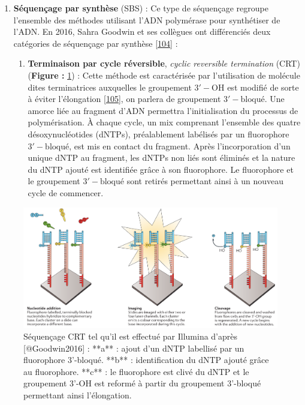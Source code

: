 \documentclass[12pt,twoside]{reedthesis}
\providecommand{\tightlist}{%
  \setlength{\itemsep}{0pt}\setlength{\parskip}{0pt}}
\theoremstyle{definition}
\theoremstyle{definition}
\theoremstyle{remark}
\begin{document}
  \begin{enumerate}
  \def\labelenumi{\arabic{enumi}.}
  \tightlist
  \item
    \textbf{Séquençage par synthèse} (SBS) : Ce type de séquençage
    regroupe l'ensemble des méthodes utilisant l'ADN polymérase pour
    synthétiser de l'ADN. En 2016, Sahra Goodwin et ses collègues ont
    différenciés deux catégories de séquençage par synthèse
    {[}\protect\hyperlink{ref-Goodwin2016}{104}{]} :
  
    \begin{enumerate}
    \def\labelenumii{\alph{enumii}.}
    \tightlist
    \item
      \textbf{Terminaison par cycle réversible}, \emph{cyclic reversible
      termination} (CRT) (\textbf{Figure : }\ref{fig:crtSeq}) : Cette
      méthode est caractérisée par l'utilisation de molécule dites
      terminatrices auxquelles le groupement \(\mathrm{3'-OH}\) est
      modifié de sorte à éviter l'élongation
      {[}\protect\hyperlink{ref-Guo2008}{105}{]}, on parlera de groupement
      \(\mathrm{3'-bloqué}\). Une amorce liée au fragment d'ADN permettra
      l'initialisation du processus de polymérisation. À chaque cycle, un
      mix comprenant l'ensemble des quatre désoxynucléotides (dNTPs),
      préalablement labélisés par un fluorophore \(\mathrm{3'-bloqué}\),
      est mis en contact du fragment. Après l'incorporation d'un unique
      dNTP au fragment, les dNTPs non liés sont éliminés et la nature du
      dNTP ajouté est identifiée grâce à son fluorophore. Le fluorophore
      et le groupement \(\mathrm{3'-bloqué}\) sont retirés permettant
      ainsi à un nouveau cycle de commencer.
    \end{enumerate}
  \end{enumerate}
  
  \begin{figure}
  
  {\centering \includegraphics[scale=.24]{figure/CRT_seq_illumina} 
  
  }
  
  \caption[Séquençage CRT tel qu'il est effectué par Illumina]{Séquençage CRT tel qu'il est effectué par Illumina d'après [@Goodwin2016] : **a** : ajout d'un dNTP labellisé par un fluorophore 3'-bloqué. **b** : identification du dNTP ajouté grâce au fluorophore. **c** : le fluorophore est clivé du dNTP et le groupement 3'-OH est reformé à partir du groupement 3'-bloqué permettant ainsi l'élongation.}\label{fig:crtSeq}
  \end{figure}
  
\end{document}
